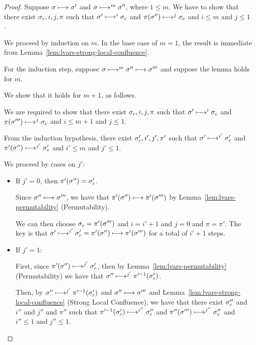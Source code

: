 \begin{proof}
  Suppose $\sigma \longmapsto \sigma'$ and $\sigma \longmapsto^m
  \sigma''$, where $1 \leq m$.  We have to show that there exist
  $\sigma_c, i, j, \pi$ such that $\sigma' \longmapsto^i \sigma_c$ and
  $\pi(\sigma'') \longmapsto^j \sigma_c$ and $i \leq m$ and $j \leq 1$.

  We proceed by induction on $m$.  In the base case of $m = 1$, the
  result is immediate from
  Lemma~\ref{lem:lvars-strong-local-confluence}.

  For the induction step, suppose $\sigma \longmapsto^m \sigma''
  \longmapsto \sigma'''$ and suppose the lemma holds for $m$.

  We show that it holds for $m + 1$, as follows.

  We are required to show that there exist $\sigma_c, i, j, \pi$ such
  that $\sigma' \longmapsto^{i} \sigma_c$ and $\pi(\sigma''')
  \longmapsto^{j} \sigma_c$ and $i \leq m + 1$ and $j \leq 1$.

  From the induction hypothesis, there exist $\sigma_c', i', j', \pi'$
  such that $\sigma' \longmapsto^{i'} \sigma_c'$ and $\pi'(\sigma'')
  \longmapsto^{j'} \sigma_c'$ and $i' \leq m$ and $j' \leq 1$.

  We proceed by cases on $j'$:
  \begin{itemize}

  \item If $j' = 0$, then $\pi'(\sigma'') = \sigma_c'$.

    Since $\sigma'' \longmapsto \sigma'''$, we have that $\pi'(\sigma'')
    \longmapsto \pi'(\sigma''')$ by
    Lemma~\ref{lem:lvars-permutability} (Permutability).

    We can then choose $\sigma_c = \pi'(\sigma''')$ and $i = i' + 1$ and
    $j = 0$ and $\pi = \pi'$.  The key is that $\sigma'
    \longmapsto^{i'} \sigma'_c = \pi'(\sigma'') \longmapsto
    \pi'(\sigma''')$ for a total of $i' + 1$ steps.
    
  \item If $j' = 1$:

    First, since $\pi'(\sigma'') \longmapsto^{j'} \sigma'_c$, then by
    Lemma~\ref{lem:lvars-permutability} (Permutability) we have that
    $\sigma'' \longmapsto^{j'} \pi'^{-1}(\sigma'_c)$.

    Then, by $\sigma'' \longmapsto^{j'} \pi'^{-1}(\sigma'_c)$ and
    $\sigma'' \longmapsto \sigma'''$ and
    Lemma~\ref{lem:lvars-strong-local-confluence} (Strong Local
    Confluence), we have that there exist $\sigma_c''$ and $i''$ and
    $j''$ and $\pi''$ such that $\pi'^{-1}(\sigma'_c)
    \longmapsto^{i''} \sigma_c''$ and $\pi''(\sigma''')
    \longmapsto^{j''} \sigma_c''$ and $i'' \leq 1$ and $j'' \leq 1$.


\end{itemize}
\end{proof}
